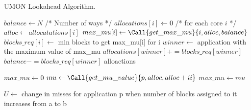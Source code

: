 \begin{algorithm}[ht]
\caption{UMON Lookahead Algorithm.}
\label{alg:algorithms:ucp}
\begin{algorithmic}[1]
\State $balance\gets N$ /* Number of ways */
\State $allocations[i]\gets 0$ /* for each core $i$ */
        \State $alloc\gets allocatations[i]$
        \State $max\_mu[i]\gets \Call{get\_max\_mu}{i, alloc, balance}$
        \State $blocks\_req[i]\gets$ min blocks to get max\_mu[i] for i
    \EndFor
    \State $winner\gets$ application with the maximum value of max\_mu
    \State $allocations[winner] += blocks\_req[winner]$
    \State $balance -= blocks\_req[winner]$
\EndWhile
\State \Return alloactions
\State

    \State $max\_mu\gets 0$
        \State $mu\gets \Call{get\_mu\_value}{p, alloc, alloc+ii}$
            \State $max\_mu\gets mu$
        \EndIf
    \EndFor
    \State {}
\EndFunction
\State

    \State $U\gets$ change in misses for application p when number of blocks assigned to it increases from a to b
    \State {}
\EndFunction
\end{algorithmic}
\end{algorithm}